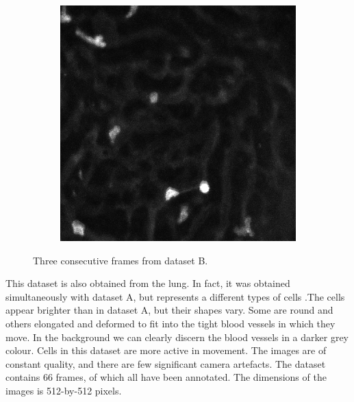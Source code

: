 \begin{figure}[h]
\begin{subfigure}{.32\textwidth}
		\end{subfigure}
		\hfill
		\begin{subfigure}{.32\textwidth}
		\includegraphics[width=\textwidth]{images/series30red025}
		\end{subfigure}
		\caption{Three consecutive frames from dataset B.}
		\label{fig:data_datasetB}
	\end{figure}
	
	This dataset is also obtained from the lung. In fact, it was obtained simultaneously with dataset A, but represents a different types of cells .The cells appear brighter than in dataset A, but their shapes vary. Some are round and others elongated and deformed to fit into the tight blood vessels  in which they move. In the background we can clearly discern the blood vessels in a darker grey colour. Cells in this dataset are more active in movement. The images are of constant quality, and there are few significant camera artefacts. The dataset contains 66 frames, of which all have been annotated. The dimensions of the images is 512-by-512 pixels.
		
